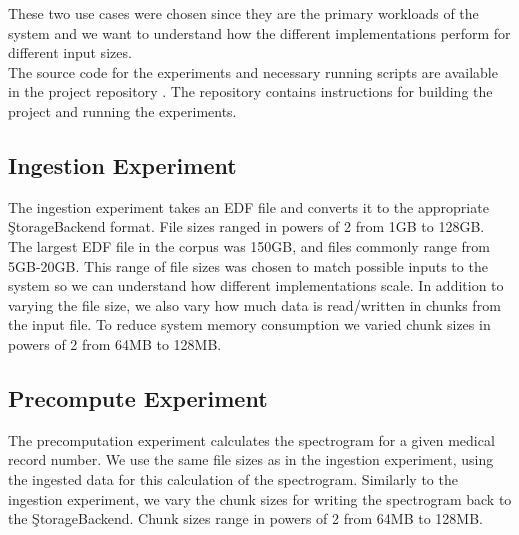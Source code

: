 These two use cases were chosen since they are the primary workloads of the
system and we want to understand how the different implementations perform for
different input sizes.\\

The source code for the experiments and necessary running scripts are available
in the project repository \cite{eeg-toolkit}. The repository contains
instructions for building the project and running the experiments.

\subsection{Ingestion Experiment}\label{storage_ch:ingestion-exp}
The ingestion experiment takes an EDF file and converts it to the appropriate
\c{StorageBackend} format. File sizes ranged in powers of 2 from 1GB to 128GB.
The largest EDF file in the corpus was 150GB, and files commonly range from
5GB-20GB. This range of file sizes was chosen to match possible inputs to the
system so we can understand how different implementations scale. In addition to
varying the file size, we also vary how much data is read/written in chunks
from the input file. To reduce system memory consumption we varied chunk sizes
in powers of 2 from 64MB to 128MB.

\subsection{Precompute Experiment}\label{storage_ch:precompute-exp}
The precomputation experiment calculates the spectrogram for a given medical
record number. We use the same file sizes as in the ingestion experiment, using
the ingested data for this calculation of the spectrogram. Similarly to the
ingestion experiment, we vary the chunk sizes for writing the spectrogram back
to the \c{StorageBackend}. Chunk sizes range in powers of 2 from 64MB to 128MB.

